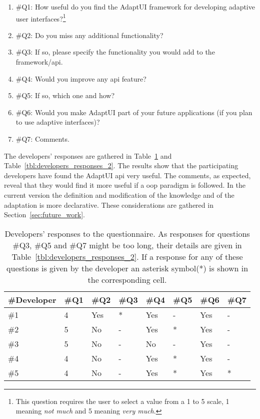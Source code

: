\begin{enumerate}
 \item \#Q1: How useful do you find the AdaptUI framework for developing adaptive 
 user interfaces?\footnote{This question requires the user to select a value from
 a 1 to 5 scale, 1 meaning \textit{not much} and 5 meaning \textit{very much}.}
 \item \#Q2: Do you miss any additional functionality?
 \item \#Q3: If so, please specify the functionality you would add to the 
 framework/\ac{api}.
 \item \#Q4: Would you improve any \ac{api} feature?
 \item \#Q5: If so, which one and how?
 \item \#Q6: Would you make AdaptUI part of your future applications (if you 
 plan to use adaptive interfaces)?
 \item \#Q7: Comments.
\end{enumerate}

The developers' responses are gathered in Table~\ref{tbl:developers_responses}
and Table~\ref{tbl:developers_responses_2}. The results show that the participating 
developers have found the AdaptUI \ac{api} very useful. The comments, as expected, 
reveal that they would find it more useful if a \acs{oop} paradigm is followed. 
In the current version the definition and modification of the knowledge and of 
the adaptation is more declarative. These considerations are gathered in 
Section~\ref{sec:future_work}.

\begin{table}
  \caption{Developers' responses to the questionnaire. As responses for questions 
  \#Q3, \#Q5 and \#Q7 might be too long, their details are given in 
  Table~\ref{tbl:developers_responses_2}. If a response for any of these questions
  is given by the developer an asterisk symbol(*) is shown in the corresponding
  cell.}
 \label{tbl:developers_responses}
\footnotesize
\centering
 \begin{tabular}{l l l l l l l l}
  \hline 
  \textbf{\#Developer} 	& \textbf{\#Q1} & \textbf{\#Q2} & \textbf{\#Q3} & \textbf{\#Q4} & \textbf{\#Q5} & \textbf{\#Q6} & \textbf{\#Q7} \\
  \hline
  \#1			& 4		& Yes		& * 		& Yes	 	& - 		& Yes 		& - \\
  \#2			& 5		& No		& - 		& Yes		& *		& Yes		& - \\
  \#3			& 5		& No		& - 		& No		& -		& Yes		& - \\
  \#4			& 4		& No		& - 		& Yes		& *		& Yes		& - \\
  \#5			& 4		& No		& - 		& Yes		& *		& Yes		& * \\
  \hline
\end{tabular}
\end{table}

